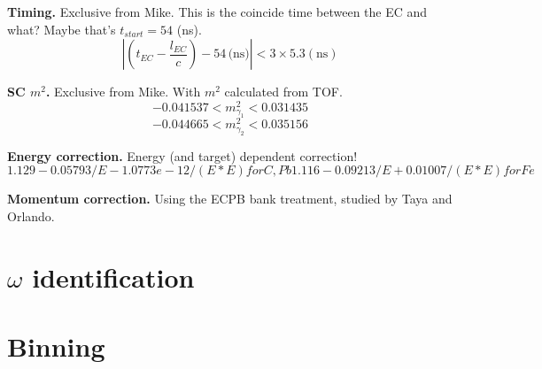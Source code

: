 \textbf{Timing.} Exclusive from Mike. This is the coincide time between the EC and what? Maybe that's $t_{start} = 54$ (ns).
\begin{equation}
    \left| \left( t_{EC} - \frac{l_{EC}}{c}\right) - 54 \, \mbox{(ns)} \right| < 3 \times 5.3 (\mbox{ns})
\end{equation}

\textbf{SC $m^2$.} Exclusive from Mike. With $m^2$ calculated from TOF.
\begin{equation}
    -0.041537 < m^2_{\gamma_1} < 0.031435
\end{equation}
\begin{equation}
    -0.044665 < m^2_{\gamma_2} < 0.035156
\end{equation}

\textbf{Energy correction.} Energy (and target) dependent correction!
\begin{equation}
    1.129-0.05793/E-1.0773e-12/(E*E) for C, Pb 
    1.116-0.09213/E+0.01007/(E*E) for Fe
\end{equation}

\textbf{Momentum correction.} Using the ECPB bank treatment, studied by Taya and Orlando.


\section{$\omega$ identification}



\section{Binning}



